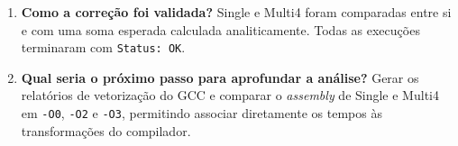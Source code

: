 \begin{enumerate}
    \item \textbf{Como a correção foi validada?} Single e Multi4 foram comparadas entre si e
    com uma soma esperada calculada analiticamente. Todas as execuções terminaram com
    \texttt{Status: OK}.

    \item \textbf{Qual seria o próximo passo para aprofundar a análise?} Gerar os relatórios
    de vetorização do GCC e comparar o \textit{assembly} de Single e Multi4 em
    \texttt{-O0}, \texttt{-O2} e \texttt{-O3}, permitindo associar diretamente os tempos
    às transformações do compilador.
\end{enumerate}